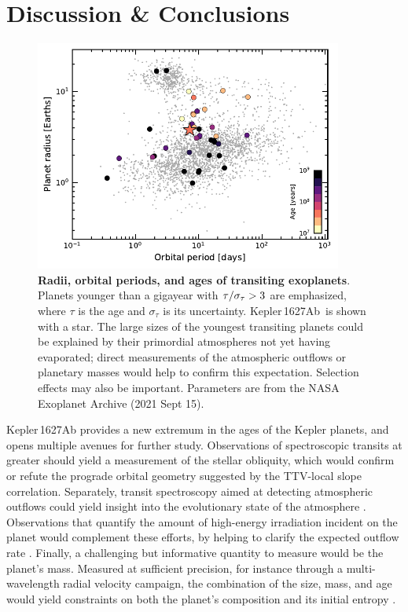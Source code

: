 \documentclass[12pt,modern,twocolumn,tighten,linenumbers]{aastex63}
\newcommand{\pn}{Kepler\,1627Ab} %
\begin{document}
\section{Discussion \& Conclusions}
\label{sec:conc}

\begin{figure}[!t]
	\begin{center}
		\leavevmode
		\includegraphics[width=0.9\textwidth]{f8.pdf}
	\end{center}
	\vspace{-0.7cm}
	\caption{
		{\bf Radii, orbital periods, and ages of transiting exoplanets}.
		Planets younger than a gigayear with ${\rm \tau}/\sigma_{\tau} >
		3$ are emphasized, where $\tau$ is the age and $\sigma_{\tau}$ is
		its uncertainty.  \pn\ is shown with a star.  The large sizes of
		the youngest transiting planets could be explained by their
		primordial atmospheres not yet having evaporated; direct
		measurements of the atmospheric outflows or planetary masses would
		help to confirm this expectation.  Selection effects may also be
		important.  Parameters are from the NASA Exoplanet Archive (2021
		Sept 15).
		\label{fig:rp_period_age}
	}
\end{figure}

Kepler\,1627Ab provides a new extremum in the ages of the Kepler
planets, and opens multiple avenues for further study.  Observations
of spectroscopic transits at greater
 should yield a
measurement of the stellar obliquity, which would confirm or refute
the prograde orbital geometry suggested by the TTV-local slope
correlation.  Separately, transit spectroscopy aimed at detecting
atmospheric outflows could yield insight into the evolutionary state
of the atmosphere \citep[{\it
e.g.},][]{ehrenreich_giant_2015,spake_helium_2018,vissapragada_2020}.
Observations that quantify the amount of high-energy
irradiation incident on the planet would complement these efforts, by
helping to clarify the expected outflow rate \citep[{\it
e.g.},][]{poppenhaeger_2021}.  Finally, a challenging but informative
quantity to measure would be the planet's mass.  Measured at
sufficient precision,
for instance through a multi-wavelength radial velocity campaign,
the combination of the size, mass, and age 
would yield constraints on both the planet's composition and its
initial entropy \citep{owen_constraining_2020}.
\end{document}
